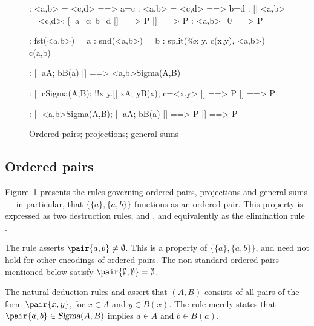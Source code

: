 \begin{figure}
\begin{alltt*}\isastyleminor
{}: <a,b> = <c,d> ==> a=c
: <a,b> = <c,d> ==> b=d
:  [| <a,b> = <c,d>;  [| a=c; b=d |] ==> P |] ==> P
:   <a,b>=0 ==> P

:     fst(<a,b>) = a
:     snd(<a,b>) = b
:        split(\%x y. c(x,y), <a,b>) = c(a,b)

:     [| a\isasymin{}A;  b\isasymin{}B(a) |] ==> <a,b>\isasymin{}Sigma(A,B)

:     [| c\isasymin{}Sigma(A,B);  
                !!x y.[| x\isasymin{}A; y\isasymin{}B(x); c=<x,y> |] ==> P |] ==> P

:    [| <a,b>\isasymin{}Sigma(A,B);    
                [| a\isasymin{}A;  b\isasymin{}B(a) |] ==> P   |] ==> P
\end{alltt*}
\caption{Ordered pairs; projections; general sums} \label{zf-pair}
\end{figure}


\subsection{Ordered pairs} \label{sec:pairs}

Figure~\ref{zf-pair} presents the rules governing ordered pairs,
projections and general sums --- in particular, that
$\{\{a\},\{a,b\}\}$ functions as an ordered pair.  This property is
expressed as two destruction rules,
 and , and equivalently
as the elimination rule .

The rule  asserts $\pair{a,b}\neq\emptyset$.  This
is a property of $\{\{a\},\{a,b\}\}$, and need not hold for other 
encodings of ordered pairs.  The non-standard ordered pairs mentioned below
satisfy $\pair{\emptyset;\emptyset}=\emptyset$.

The natural deduction rules  and 
assert that $(A,B)$ consists of all pairs of the form
$\pair{x,y}$, for $x\in A$ and $y\in B(x)$.  The rule 
merely states that $\pair{a,b}\in \isa{Sigma}(A,B)$ implies $a\in A$ and
$b\in B(a)$.

